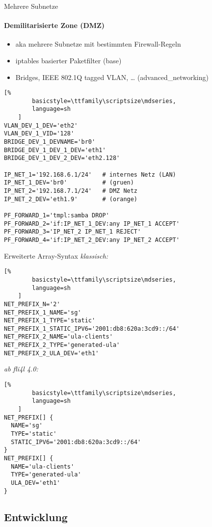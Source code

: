 \documentclass[t]{beamer}
\begin{document}
\begin{frame}[fragile]{Mehrere Subnetze}
    \framesubtitle{Demilitarisierte Zone (DMZ)}
    \begin{itemize}
        \item aka mehrere Subnetze mit bestimmten Firewall-Regeln
        \item iptables basierter Paketfilter (base)
        \item Bridges, IEEE 802.1Q tagged VLAN, … (advanced\_networking)
    \end{itemize}
    \pause
    \begin{lstlisting}[%
        basicstyle=\ttfamily\scriptsize\mdseries,
        language=sh
    ]
VLAN_DEV_1_DEV='eth2'
VLAN_DEV_1_VID='128'
BRIDGE_DEV_1_DEVNAME='br0'
BRIDGE_DEV_1_DEV_1_DEV='eth1'
BRIDGE_DEV_1_DEV_2_DEV='eth2.128'

IP_NET_1='192.168.6.1/24'   # internes Netz (LAN)
IP_NET_1_DEV='br0'          # (gruen)
IP_NET_2='192.168.7.1/24'   # DMZ Netz
IP_NET_2_DEV='eth1.9'       # (orange)

PF_FORWARD_1='tmpl:samba DROP'
PF_FORWARD_2='if:IP_NET_1_DEV:any IP_NET_1 ACCEPT'
PF_FORWARD_3='IP_NET_2 IP_NET_1 REJECT'
PF_FORWARD_4='if:IP_NET_2_DEV:any IP_NET_2 ACCEPT'
    \end{lstlisting}
\end{frame}

\begin{frame}[fragile,label=extarray]{Erweiterte Array-Syntax}
    \emph{\small klassisch:}
    \begin{lstlisting}[%
        basicstyle=\ttfamily\scriptsize\mdseries,
        language=sh
    ]
NET_PREFIX_N='2'
NET_PREFIX_1_NAME='sg'
NET_PREFIX_1_TYPE='static'
NET_PREFIX_1_STATIC_IPV6='2001:db8:620a:3cd9::/64'
NET_PREFIX_2_NAME='ula-clients'
NET_PREFIX_2_TYPE='generated-ula'
NET_PREFIX_2_ULA_DEV='eth1'
    \end{lstlisting}
    \pause
    \emph{\small ab fli4l 4.0:}
    \begin{lstlisting}[%
        basicstyle=\ttfamily\scriptsize\mdseries,
        language=sh
    ]
NET_PREFIX[] {
  NAME='sg'
  TYPE='static'
  STATIC_IPV6='2001:db8:620a:3cd9::/64'
}
NET_PREFIX[] {
  NAME='ula-clients'
  TYPE='generated-ula'
  ULA_DEV='eth1'
}
    \end{lstlisting}
\end{frame}

\subsection{Entwicklung}
\end{document}
